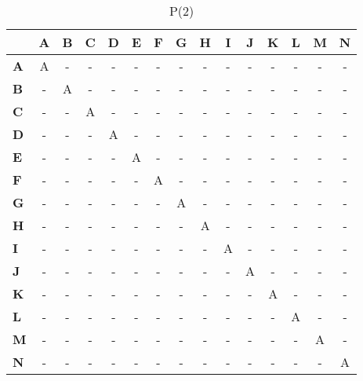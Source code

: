 \documentclass{article}
\begin{document}
\begin{table}[H]\centering
\caption{P(2)}
\begin{tabular}{l c c c c c c c c c c c c c c}
\toprule
 & \textbf{A} & \textbf{B} & \textbf{C} & \textbf{D} & \textbf{E} & \textbf{F} & \textbf{G} & \textbf{H} & \textbf{I} & \textbf{J} & \textbf{K} & \textbf{L} & \textbf{M} & \textbf{N}\\\midrule
\textbf{A} & A & - & - & - & - & - & - & - & - & - & - & - & - & - \\
\textbf{B} & - & A & - & - & - & - & - & - & - & - & - & - & - & - \\
\textbf{C} & - & - & A & - & - & - & - & - & - & - & - & - & - & - \\
\textbf{D} & - & - & - & A & - & - & - & - & - & - & - & - & - & - \\
\textbf{E} & - & - & - & - & A & - & - & - & - & - & - & - & - & - \\
\textbf{F} & - & - & - & - & - & A & - & - & - & - & - & - & - & - \\
\textbf{G} & - & - & - & - & - & - & A & - & - & - & - & - & - & - \\
\textbf{H} & - & - & - & - & - & - & - & A & - & - & - & - & - & - \\
\textbf{I} & - & - & - & - & - & - & - & - & A & - & - & - & - & - \\
\textbf{J} & - & - & - & - & - & - & - & - & - & A & - & - & - & - \\
\textbf{K} & - & - & - & - & - & - & - & - & - & - & A & - & - & - \\
\textbf{L} & - & - & - & - & - & - & - & - & - & - & - & A & - & - \\
\textbf{M} & - & - & - & - & - & - & - & - & - & - & - & - & A & - \\
\textbf{N} & - & - & - & - & - & - & - & - & - & - & - & - & - & A \\
\bottomrule
\end{tabular}
\end{table}
\end{document}
